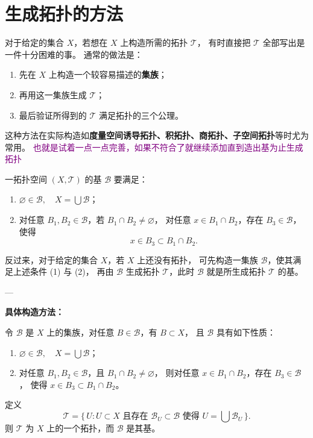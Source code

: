 \section{生成拓扑的方法}
\begin{remark}[构造拓扑的常用方法]
对于给定的集合 $X$，若想在 $X$ 上构造所需的拓扑 $\mathcal{T}$，
有时直接把 $\mathcal{T}$ 全部写出是一件十分困难的事。
通常的做法是：

\begin{enumerate}
  \item 先在 $X$ 上构造一个较容易描述的\textbf{集族}；
  \item 再用这一集族生成 $\mathcal{T}$；
  \item 最后验证所得到的 $\mathcal{T}$ 满足拓扑的三个公理。
\end{enumerate}

这种方法在实际构造如\textbf{度量空间诱导拓扑、积拓扑、商拓扑、子空间拓扑}等时尤为常用。
\textcolor{purple}{也就是试着一点一点完善，如果不符合了就继续添加直到造出基为止生成拓扑}
\end{remark}
\begin{proposition}[构造拓扑的基]
一拓扑空间 $(X, \mathcal{T})$ 的基 $\mathcal{B}$ 要满足：

\begin{enumerate}
  \item[(1)] $\varnothing \in \mathcal{B}, \quad X = \bigcup \mathcal{B}$；
  \item[(2)] 对任意 $B_1, B_2 \in \mathcal{B}$，若 $B_1 \cap B_2 \ne \varnothing$，
  对任意 $x \in B_1 \cap B_2$，存在 $B_3 \in \mathcal{B}$，使得
  \[
  x \in B_3 \subset B_1 \cap B_2.
  \]
\end{enumerate}

反过来，对于给定的集合 $X$，若 $X$ 上还没有拓扑，
可先构造一集族 $\mathcal{B}$，使其满足上述条件 (1) 与 (2)，
再由 $\mathcal{B}$ 生成拓扑 $\mathcal{T}$，此时 $\mathcal{B}$ 就是所生成拓扑 $\mathcal{T}$ 的基。

---



\textbf{具体构造方法：}

令 $\mathcal{B}$ 是 $X$ 上的集族，对任意 $B \in \mathcal{B}$，有 $B \subset X$，
且 $\mathcal{B}$ 具有如下性质：
\begin{enumerate}
  \item[(1)] $\varnothing \in \mathcal{B}, \quad X = \bigcup \mathcal{B}$；
  \item[(2)] 对任意 $B_1, B_2 \in \mathcal{B}$，且 $B_1 \cap B_2 \ne \varnothing$，
  则对任意 $x \in B_1 \cap B_2$，存在 $B_3 \in \mathcal{B}$，
  使得 $x \in B_3 \subset B_1 \cap B_2$。
\end{enumerate}

定义
\[
\mathcal{T} = \{\, U : U \subset X \text{ 且存在 } \mathcal{B}_U \subset \mathcal{B}
\text{ 使得 } U = \bigcup \mathcal{B}_U \,\}.
\]
则 $\mathcal{T}$ 为 $X$ 上的一个拓扑，而 $\mathcal{B}$ 是其基。
\end{proposition}
